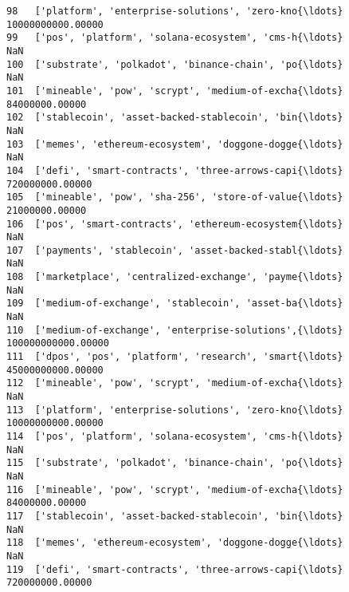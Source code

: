 \documentclass[11pt]{article}
\begin{document}
\begin{tcolorbox}[breakable, size=fbox, boxrule=.5pt, pad at break*=1mm, opacityfill=0]
\begin{Verbatim}[commandchars=\\\{\}]
98   ['platform', 'enterprise-solutions', 'zero-kno{\ldots}  10000000000.00000
99   ['pos', 'platform', 'solana-ecosystem', 'cms-h{\ldots}                NaN
100  ['substrate', 'polkadot', 'binance-chain', 'po{\ldots}                NaN
101  ['mineable', 'pow', 'scrypt', 'medium-of-excha{\ldots}     84000000.00000
102  ['stablecoin', 'asset-backed-stablecoin', 'bin{\ldots}                NaN
103  ['memes', 'ethereum-ecosystem', 'doggone-dogge{\ldots}                NaN
104  ['defi', 'smart-contracts', 'three-arrows-capi{\ldots}    720000000.00000
105  ['mineable', 'pow', 'sha-256', 'store-of-value{\ldots}     21000000.00000
106  ['pos', 'smart-contracts', 'ethereum-ecosystem{\ldots}                NaN
107  ['payments', 'stablecoin', 'asset-backed-stabl{\ldots}                NaN
108  ['marketplace', 'centralized-exchange', 'payme{\ldots}                NaN
109  ['medium-of-exchange', 'stablecoin', 'asset-ba{\ldots}                NaN
110  ['medium-of-exchange', 'enterprise-solutions',{\ldots} 100000000000.00000
111  ['dpos', 'pos', 'platform', 'research', 'smart{\ldots}  45000000000.00000
112  ['mineable', 'pow', 'scrypt', 'medium-of-excha{\ldots}                NaN
113  ['platform', 'enterprise-solutions', 'zero-kno{\ldots}  10000000000.00000
114  ['pos', 'platform', 'solana-ecosystem', 'cms-h{\ldots}                NaN
115  ['substrate', 'polkadot', 'binance-chain', 'po{\ldots}                NaN
116  ['mineable', 'pow', 'scrypt', 'medium-of-excha{\ldots}     84000000.00000
117  ['stablecoin', 'asset-backed-stablecoin', 'bin{\ldots}                NaN
118  ['memes', 'ethereum-ecosystem', 'doggone-dogge{\ldots}                NaN
119  ['defi', 'smart-contracts', 'three-arrows-capi{\ldots}    720000000.00000


\end{Verbatim}
\end{tcolorbox}
\end{document}
